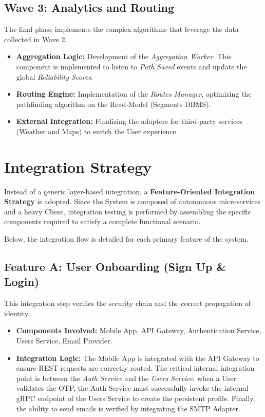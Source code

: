 \subsection*{Wave 3: Analytics and Routing}
The final phase implements the complex algorithms that leverage the data collected in Wave 2.
\begin{itemize}
    \item \textbf{Aggregation Logic:} Development of the \emph{Aggregation Worker}. This component is implemented to listen to \emph{Path Saved} events and update the global \emph{Reliability Scores}.
    \item \textbf{Routing Engine:} Implementation of the \emph{Routes Manager}, optimizing the pathfinding algorithm on the Read-Model (Segments DBMS).
    \item \textbf{External Integration:} Finalizing the adapters for third-party services (Weather and Maps) to enrich the User experience.
\end{itemize}

\section{Integration Strategy}
Instead of a generic layer-based integration, a \textbf{Feature-Oriented Integration Strategy} is adopted. Since the System is composed of autonomous microservices and a heavy Client, integration testing is performed by assembling the specific components required to satisfy a complete functional scenario.

\noindent
Below, the integration flow is detailed for each primary feature of the system.

\subsection*{Feature A: User Onboarding (Sign Up \& Login)}
This integration step verifies the security chain and the correct propagation of identity.
\begin{itemize}
    \item \textbf{Components Involved:} Mobile App, API Gateway, Authentication Service, Users Service, Email Provider.
    \item \textbf{Integration Logic:} The Mobile App is integrated with the API Gateway to ensure REST requests are correctly routed. The critical internal integration point is between the \emph{Auth Service} and the \emph{Users Service}: when a User validates the OTP, the Auth Service must successfully invoke the internal gRPC endpoint of the Users Service to create the persistent profile. Finally, the ability to send emails is verified by integrating the SMTP Adapter.
\end{itemize}

